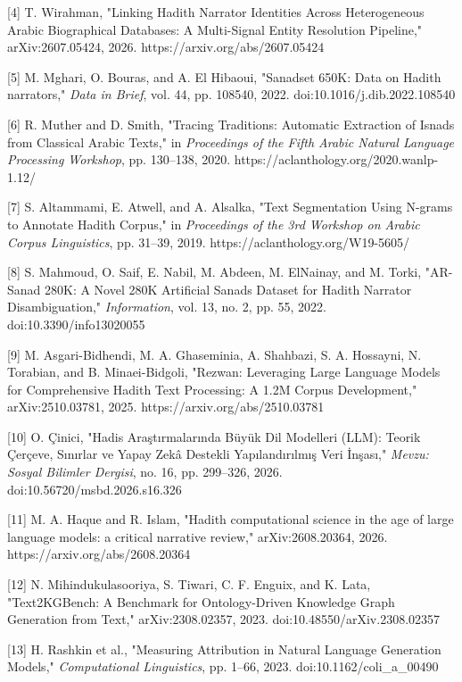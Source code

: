 \documentclass[
  english,
]{article}
\begin{document}
{[}4{]} T. Wirahman, "Linking Hadith Narrator Identities Across
Heterogeneous Arabic Biographical Databases: A Multi-Signal Entity
Resolution Pipeline," arXiv:2607.05424, 2026.
https://arxiv.org/abs/2607.05424

{[}5{]} M. Mghari, O. Bouras, and A. El Hibaoui, "Sanadset 650K: Data on
Hadith narrators," \emph{Data in Brief}, vol. 44, pp. 108540, 2022.
doi:10.1016/j.dib.2022.108540

{[}6{]} R. Muther and D. Smith, "Tracing Traditions: Automatic
Extraction of Isnads from Classical Arabic Texts," in \emph{Proceedings
of the Fifth Arabic Natural Language Processing Workshop}, pp. 130--138,
2020. https://aclanthology.org/2020.wanlp-1.12/

{[}7{]} S. Altammami, E. Atwell, and A. Alsalka, "Text Segmentation
Using N-grams to Annotate Hadith Corpus," in \emph{Proceedings of the
3rd Workshop on Arabic Corpus Linguistics}, pp. 31--39, 2019.
https://aclanthology.org/W19-5605/

{[}8{]} S. Mahmoud, O. Saif, E. Nabil, M. Abdeen, M. ElNainay, and M.
Torki, "AR-Sanad 280K: A Novel 280K Artificial Sanads Dataset for Hadith
Narrator Disambiguation," \emph{Information}, vol. 13, no. 2, pp. 55,
2022. doi:10.3390/info13020055

{[}9{]} M. Asgari-Bidhendi, M. A. Ghaseminia, A. Shahbazi, S. A.
Hossayni, N. Torabian, and B. Minaei-Bidgoli, "Rezwan: Leveraging Large
Language Models for Comprehensive Hadith Text Processing: A 1.2M Corpus
Development," arXiv:2510.03781, 2025. https://arxiv.org/abs/2510.03781

{[}10{]} O. Çinici, "Hadis Araştırmalarında Büyük Dil Modelleri (LLM):
Teorik Çerçeve, Sınırlar ve Yapay Zekâ Destekli Yapılandırılmış Veri
İnşası," \emph{Mevzu: Sosyal Bilimler Dergisi}, no. 16, pp. 299--326,
2026. doi:10.56720/msbd.2026.s16.326

{[}11{]} M. A. Haque and R. Islam, "Hadith computational science in the
age of large language models: a critical narrative review,"
arXiv:2608.20364, 2026. https://arxiv.org/abs/2608.20364

{[}12{]} N. Mihindukulasooriya, S. Tiwari, C. F. Enguix, and K. Lata,
"Text2KGBench: A Benchmark for Ontology-Driven Knowledge Graph
Generation from Text," arXiv:2308.02357, 2023.
doi:10.48550/arXiv.2308.02357

{[}13{]} H. Rashkin et al., "Measuring Attribution in Natural Language
Generation Models," \emph{Computational Linguistics}, pp. 1--66, 2023.
doi:10.1162/coli\_a\_00490
\end{document}
